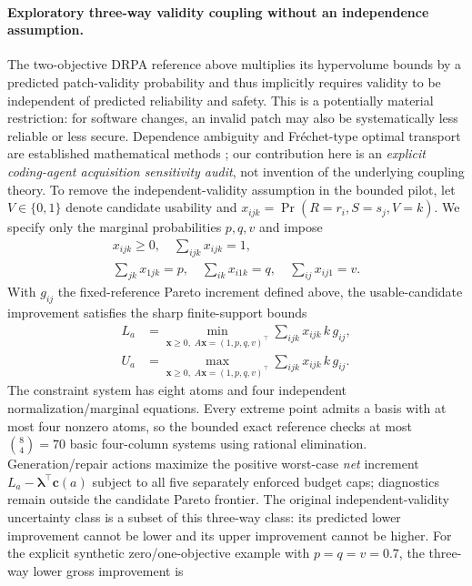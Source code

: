 \documentclass[pdflatex,sn-basic]{sn-jnl}
\begin{document}
\paragraph{Exploratory three-way validity coupling without an independence assumption.}
The two-objective DRPA reference above multiplies its hypervolume bounds
by a predicted patch-validity probability and thus implicitly requires
validity to be independent of predicted reliability and safety. This is
a potentially material restriction: for software changes, an invalid
patch may also be systematically less reliable or less secure.
Dependence ambiguity and Fr\'echet-type optimal transport are established
mathematical methods \cite{bartl2022dependence}; our contribution here
is an \emph{explicit coding-agent acquisition sensitivity audit},
not invention of the underlying coupling theory.
To remove the independent-validity assumption in the bounded pilot,
let $V\in\{0,1\}$ denote candidate usability and
$x_{ijk}=\Pr(R=r_i,S=s_j,V=k)$. We specify only
the marginal probabilities $p,q,v$ and impose
\[
\begin{gathered}
 x_{ijk}\ge0,\quad\sum_{ijk}x_{ijk}=1,\\
 \sum_{jk}x_{1jk}=p,\quad
 \sum_{ik}x_{i1k}=q,\quad
 \sum_{ij}x_{ij1}=v.
\end{gathered}
\]
With $g_{ij}$ the fixed-reference Pareto increment defined above,
the usable-candidate improvement satisfies the sharp finite-support
bounds
\[
\begin{split}
 L_a &=\min_{\mathbf x\ge0,\;A\mathbf x=(1,p,q,v)^\top}
        \sum_{ijk}x_{ijk}\,k\,g_{ij},\\
 U_a &=\max_{\mathbf x\ge0,\;A\mathbf x=(1,p,q,v)^\top}
        \sum_{ijk}x_{ijk}\,k\,g_{ij}.
\end{split}
\]
The constraint system has eight atoms and four independent
normalization/marginal equations. Every extreme point admits a basis
with at most four nonzero atoms, so the bounded exact reference checks
at most $\binom{8}{4}=70$ basic four-column systems using rational
elimination. Generation/repair actions maximize the positive
worst-case \emph{net} increment $L_a-\boldsymbol\lambda^\top\mathbf c(a)$
subject to all five separately enforced budget caps; diagnostics
remain outside the candidate Pareto frontier. The original
independent-validity uncertainty class is a subset of this
three-way class: its predicted lower improvement cannot be lower
and its upper improvement cannot be higher.
For the explicit synthetic zero/one-objective example with
$p=q=v=0.7$, the three-way lower gross improvement is
\end{document}
